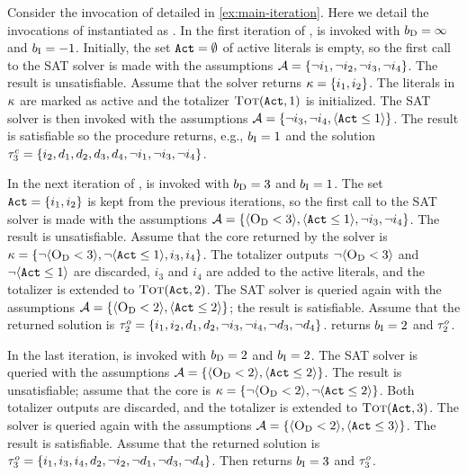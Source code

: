 \begin{example}\label{ex:msu}
  Consider the invocation of \algname{} detailed in \cref{ex:main-iteration}. 
  Here we detail the invocations of \Min{} instantiated as \msu{}. 
  In the first iteration of \algname{}, \msu{} is invoked with $b_{\text{D}} =\infty$ and $b_{\text{I}} = -1$.
  Initially, the set $\texttt{Act} = \emptyset$ of active literals is empty, so the first call to the SAT solver is made with the assumptions $\mathcal{A} =  \{ \lnot i_1, \allowbreak \lnot i_2, \allowbreak \lnot i_3, \allowbreak \lnot i_4\}$.
  The result is unsatisfiable.
  Assume that the solver returns $\kappa = \{i_1, i_2\}$. 
  The literals in $\kappa$ are marked as active and the totalizer $\textsc{Tot}(\texttt{Act}, 1)$ is initialized.
  The SAT solver is then invoked with the assumptions $\mathcal{A} = \{ \lnot i_3, \lnot i_4, \langle \texttt{Act} \leq 1 \rangle\}$. 
  The result is satisfiable so the procedure returns, e.g., $b_{\text{I}} = 1$ and the solution $\tau^c_3 = \{i_2,\allowbreak d_1,\allowbreak d_2,\allowbreak d_3,\allowbreak d_4,\allowbreak \lnot i_1,\allowbreak \lnot i_3,\allowbreak \lnot i_4\}$.

  In the next iteration of \algname{}, \msu{} is invoked with $b_{\text{D}} = 3$ and $b_{\text{I}} = 1$.
  The set $\texttt{Act} = \{i_1, i_2\}$ is kept from the previous iterations, so the first call to the SAT solver is made with the assumptions $\mathcal{A} = \{ \langle \textsc{O}_{\text{D}} < 3 \rangle, \allowbreak \langle \texttt{Act} \leq 1 \rangle, \allowbreak \lnot i_3, \allowbreak \lnot i_4 \}$.
  The result is unsatisfiable.
  Assume that the core returned by the solver is $\kappa = \{ \lnot \langle \textsc{O}_{\text{D}} < 3 \rangle, \allowbreak \lnot \langle \texttt{Act} \leq 1 \rangle, \allowbreak i_3, \allowbreak i_4 \}$.
  The totalizer outputs $\lnot \langle \textsc{O}_{\text{D}} < 3 \rangle$ and $\lnot \langle \texttt{Act} \leq 1 \rangle$ are discarded, $i_3$ and $i_4$ are added to the active literals, and the totalizer is extended to $\textsc{Tot}(\texttt{Act}, 2)$.
  The SAT solver is queried again with the assumptions $\mathcal{A} = \{\langle \textsc{O}_{\text{D}} < 2 \rangle, \langle \texttt{Act} \leq 2 \rangle\}$;
  the result is satisfiable.
  Assume that the returned solution is $\tau^o_2 = \{i_1,\allowbreak i_2,\allowbreak d_1,\allowbreak d_2,\allowbreak \lnot i_3,\allowbreak \lnot i_4,\allowbreak \lnot d_3,\allowbreak \lnot d_4\}$.
  \msu{} returns $b_{\text{I}} = 2$ and $\tau^o_2$.

  In the last iteration, \msu{} is invoked with $b_{\text{D}} = 2$ and $b_{\text{I}} = 2$.
  The SAT solver is queried with the assumptions $\mathcal{A} = \{\langle \textsc{O}_{\text{D}} < 2 \rangle, \langle \texttt{Act} \leq 2 \rangle\}$.
  The result is unsatisfiable;
  assume that the core is $\kappa = \{ \lnot \langle \textsc{O}_{\text{D}} < 2 \rangle, \lnot \langle \texttt{Act} \leq 2 \rangle \}$.
  Both totalizer outputs are discarded, and the totalizer is extended to $\textsc{Tot}(\texttt{Act}, 3)$.
  The solver is queried again with the assumptions $\mathcal{A} = \{\langle \textsc{O}_{\text{D}} < 2 \rangle, \langle \texttt{Act} \leq 3 \rangle\}$.
  The result is satisfiable.
  Assume that the returned solution is $\tau^o_3 = \{i_1,\allowbreak i_3,\allowbreak i_4,\allowbreak d_2,\allowbreak \lnot i_2,\allowbreak \lnot d_1,\allowbreak \lnot d_3,\allowbreak \lnot d_4\}$.
  Then \msu{} returns $b_{\text{I}} = 3$ and $\tau^o_3$.
\end{example}

